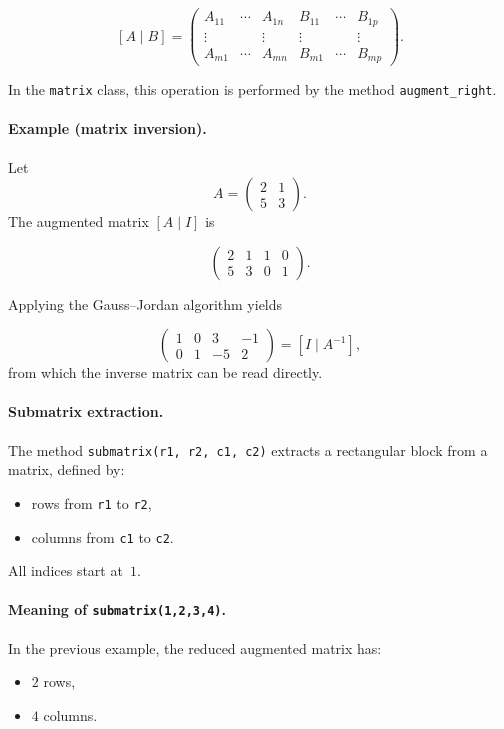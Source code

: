 \[
[A \mid B] =
\begin{pmatrix}
A_{11} & \cdots & A_{1n} & B_{11} & \cdots & B_{1p} \\
\vdots &        & \vdots & \vdots &        & \vdots \\
A_{m1} & \cdots & A_{mn} & B_{m1} & \cdots & B_{mp}
\end{pmatrix}.
\]

In the \texttt{matrix} class, this operation is performed by the method
\texttt{augment\_right}.

\medskip

\paragraph{Example (matrix inversion).}
Let
\[
A =
\begin{pmatrix}
2 & 1\\
5 & 3
\end{pmatrix}.
\]
The augmented matrix $[A \mid I]$ is

\[
\begin{pmatrix}
2 & 1 & 1 & 0\\
5 & 3 & 0 & 1
\end{pmatrix}.
\]

Applying the Gauss--Jordan algorithm yields

\[
\begin{pmatrix}
1 & 0 & 3 & -1\\
0 & 1 & -5 & 2
\end{pmatrix}
=
[I \mid A^{-1}],
\]
from which the inverse matrix can be read directly.

\medskip

\paragraph{Submatrix extraction.}
The method \texttt{submatrix(r1, r2, c1, c2)} extracts a rectangular block from a
matrix, defined by:

\begin{itemize}
  \item rows from \texttt{r1} to \texttt{r2},
  \item columns from \texttt{c1} to \texttt{c2}.
\end{itemize}

All indices start at~$1$.

\medskip

\paragraph{Meaning of \texttt{submatrix(1,2,3,4)}.}
In the previous example, the reduced augmented matrix has:
\begin{itemize}
  \item $2$ rows,
  \item $4$ columns.
\end{itemize}

